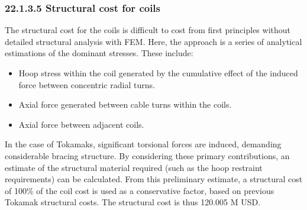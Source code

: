 \subsubsection*{22.1.3.5 Structural cost for coils}

The structural cost for the coils is difficult to cost from first principles without detailed structural analysis with FEM. Here, the approach is a series of analytical estimations of the dominant stresses. These include:

\begin{itemize}
    \item Hoop stress within the coil generated by the cumulative effect of the induced force between concentric radial turns.
    \item Axial force generated between cable turns within the coils. 
    \item Axial force between adjacent coils.
\end{itemize}


In the case of Tokamaks, significant torsional forces are induced, demanding considerable bracing structure. By considering these primary contributions, an estimate of the structural material required (such as the hoop restraint requirements) can be calculated. From this preliminary estimate, a structural cost of 100\% of the coil cost is used as a conservative factor, based on previous Tokamak structural costs. The structural cost is thus 120.005 M USD.


